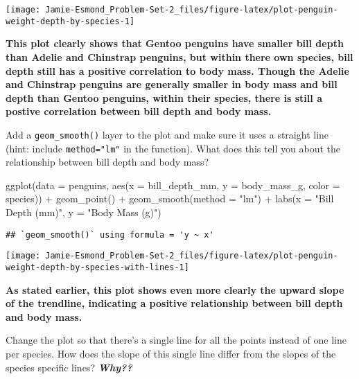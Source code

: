 \documentclass[
]{article}
\newenvironment{Shaded}{\begin{snugshade}}{\end{snugshade}}
\newcommand{\AttributeTok}[1]{\textcolor[rgb]{0.77,0.63,0.00}{#1}}
\newcommand{\FunctionTok}[1]{\textcolor[rgb]{0.00,0.00,0.00}{#1}}
\newcommand{\NormalTok}[1]{#1}
\newcommand{\SpecialCharTok}[1]{\textcolor[rgb]{0.00,0.00,0.00}{#1}}
\newcommand{\StringTok}[1]{\textcolor[rgb]{0.31,0.60,0.02}{#1}}
\begin{document}
\begin{center}\texttt{[image: Jamie-Esmond\_Problem-Set-2\_files/figure-latex/plot-penguin-weight-depth-by-species-1]} \end{center}

\textbf{This plot clearly shows that Gentoo penguins have smaller bill
depth than Adelie and Chinstrap penguins, but within there own species,
bill depth still has a positive correlation to body mass. Though the
Adelie and Chinstrap penguins are generally smaller in body mass and
bill depth than Gentoo penguins, within their species, there is still a
postive correlation between bill depth and body mass.}

Add a \texttt{geom\_smooth()} layer to the plot and make sure it uses a
straight line (hint: include \texttt{method="lm"} in the function). What
does this tell you about the relationship between bill depth and body
mass?

\begin{Shaded}
\begin{Highlighting}[]
\FunctionTok{ggplot}\NormalTok{(}\AttributeTok{data =}\NormalTok{ penguins, }
       \FunctionTok{aes}\NormalTok{(}\AttributeTok{x =}\NormalTok{ bill\_depth\_mm, }\AttributeTok{y =}\NormalTok{ body\_mass\_g, }\AttributeTok{color =}\NormalTok{ species)) }\SpecialCharTok{+}
  \FunctionTok{geom\_point}\NormalTok{() }\SpecialCharTok{+}
  \FunctionTok{geom\_smooth}\NormalTok{(}\AttributeTok{method =} \StringTok{"lm"}\NormalTok{) }\SpecialCharTok{+}
  \FunctionTok{labs}\NormalTok{(}\AttributeTok{x =} \StringTok{"Bill Depth (mm)"}\NormalTok{, }
       \AttributeTok{y =} \StringTok{"Body Mass (g)"}\NormalTok{)}
\end{Highlighting}
\end{Shaded}

\begin{verbatim}
## `geom_smooth()` using formula = 'y ~ x'
\end{verbatim}

\begin{center}\texttt{[image: Jamie-Esmond\_Problem-Set-2\_files/figure-latex/plot-penguin-weight-depth-by-species-with-lines-1]} \end{center}

\textbf{As stated earlier, this plot shows even more clearly the upward
slope of the trendline, indicating a positive relationship between bill
depth and body mass.}

Change the plot so that there's a single line for all the points instead
of one line per species. How does the slope of this single line differ
from the slopes of the species specific lines? \textbf{\emph{Why??}}
\end{document}
